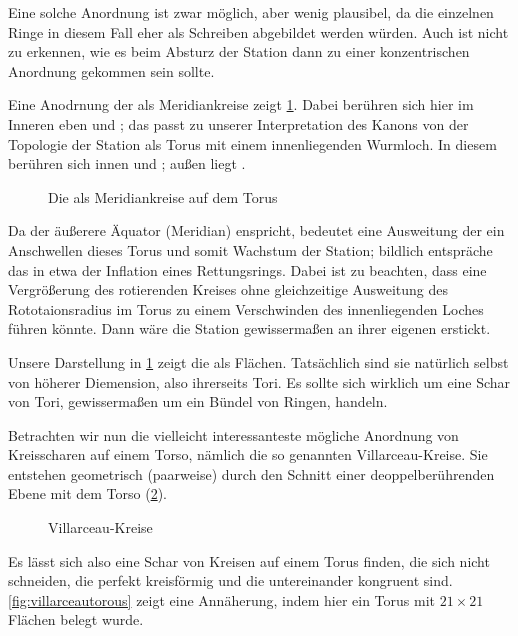 Eine solche Anordnung ist zwar möglich, aber wenig plausibel, da die einzelnen Ringe in diesem Fall eher als Schreiben abgebildet werden würden. Auch ist nicht zu erkennen, wie es beim Absturz der Station dann zu einer konzentrischen Anordnung gekommen sein sollte. 

Eine Anodrnung der  als Meridiankreise  zeigt \cref{fig:torus-meridiane}.  
Dabei berühren sich hier im Inneren eben  und ; das passt zu unserer Interpretation des Kanons von der Topologie der Station als Torus mit einem innenliegenden Wurmloch. In diesem berühren sich innen  und ; außen liegt . 

\begin{figure}[ht!]
    \centering
        
    \caption{Die  als Meridiankreise auf dem Torus}
    \label{fig:torus-meridiane}
\end{figure}


Da der äußerere Äquator (Meridian)  enspricht, bedeutet eine Ausweitung der  ein Anschwellen dieses Torus und somit Wachstum der Station; bildlich entspräche das in etwa der Inflation eines Rettungsrings. Dabei ist zu beachten, dass eine Vergrößerung des rotierenden Kreises ohne gleichzeitige Ausweitung des Rototaionsradius im Torus zu einem Verschwinden des innenliegenden Loches führen könnte. Dann wäre die Station gewissermaßen an ihrer eigenen  erstickt.

Unsere Darstellung in \cref{fig:torus-meridiane} zeigt die  als Flächen. Tatsächlich sind sie natürlich selbst von höherer Diemension, also ihrerseits Tori. Es sollte sich wirklich um eine Schar von Tori, gewissermaßen um ein Bündel von Ringen, handeln.

Betrachten wir nun die vielleicht interessanteste mögliche Anordnung von Kreisscharen auf einem Torso, nämlich die so genannten Villarceau-Kreise. Sie entstehen geometrisch (paarweise) durch den Schnitt einer deoppelberührenden Ebene mit dem Torso (\cref{fig:villarceaukreise}).

\begin{figure}[ht!]
    \centering
    
    \caption{Villarceau-Kreise \cite{villarceauag2gaeh}}
    \label{fig:villarceaukreise}
\end{figure}

Es lässt sich also eine Schar von Kreisen auf einem Torus finden, die sich nicht schneiden, die perfekt kreisförmig und die untereinander kongruent sind. \cref{fig:villarceautorous} zeigt eine Annäherung, indem hier ein Torus mit $21\times 21$ Flächen belegt wurde.


